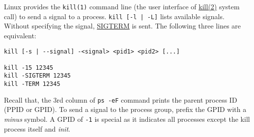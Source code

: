Linux provides the \lstinline|kill(1)| command line (the user
interface of \uline{kill(2)} system call) to send a signal to a
process. \lstinline/kill [-l | -L]/ lists available
signals. Without specifying the signal, \uline{SIGTERM} is
sent. The following three lines are equivalent:

\begin{lstlisting}
kill [-s | --signal] -<signal> <pid1> <pid2> [...]

kill -15 12345
kill -SIGTERM 12345
kill -TERM 12345
\end{lstlisting}

Recall that, the 3rd column of \lstinline|ps -eF| command prints
the parent process ID (PPID or GPID). To send a signal to the
process group, prefix the GPID with a \textit{minus} symbol. A
GPID of \verb|-1| is special as it indicates all processes except
the kill process itself and \textit{init}.



\lstset{language=TeX}

